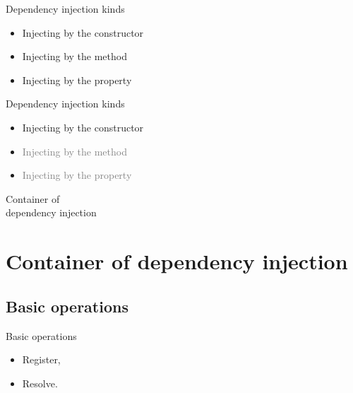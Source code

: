 \documentclass{beamer}
\begin{document}
\begin{frame}{Dependency injection kinds}
     \begin{Large}
	\begin{itemize}
		\item Injecting by the constructor
		\item Injecting by the method
		\item Injecting by the property
	\end{itemize}
     \end{Large}
\end{frame}

\begin{frame}{Dependency injection kinds}
     \begin{Large}
	\begin{itemize}
		\item Injecting by the constructor
		\item \textcolor{gray}{Injecting by the method}
		\item \textcolor{gray}{Injecting by the property}
	\end{itemize}
     \end{Large}
\end{frame}

\begin{frame}{}
	\begin{center}
		\Huge{Container of\\ dependency injection}
	\end{center}
\end{frame}

\section{Container of dependency injection}

\subsection*{Basic operations}

\begin{frame}{Basic operations}
     \begin{Large}
	\begin{itemize}
		\item Register,
		\item Resolve.
	\end{itemize}
     \end{Large}
\end{frame}
\end{document}
